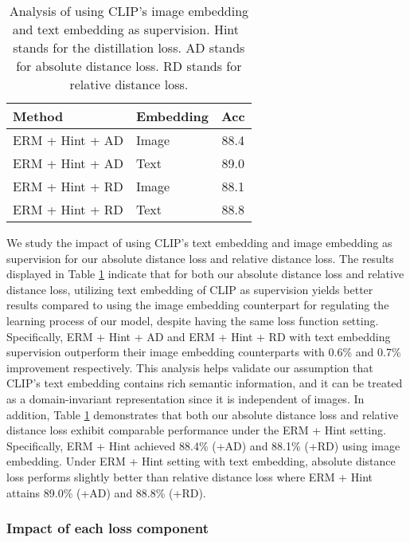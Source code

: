 \documentclass[10pt,twocolumn,letterpaper]{article}
\begin{document}
\begin{table}[htbp]
\begin{center}
\footnotesize
\begin{tabular}{l | l |  c }
\hline
Method & Embedding  & Acc \\
\hline \hline
ERM + Hint + AD & Image  & 88.4\\
\rowcolor{lightgray!30}ERM + Hint + AD & Text  & 89.0\\
\hline
ERM + Hint + RD & Image  & 88.1\\
\rowcolor{lightgray!30}ERM + Hint + RD & Text  & 88.8\\
\hline
\end{tabular}
\vspace{5pt}
\caption{Analysis of using CLIP's image embedding and text embedding as supervision. Hint~\cite{hinton2015distilling} stands for the distillation loss. AD stands for absolute distance loss. RD stands for relative distance loss.}
\label{table:textregu}
\end{center}
\end{table}

We study the impact of using CLIP's text embedding and image embedding as supervision for our absolute distance loss and relative distance loss.
The results displayed in Table \ref{table:textregu} indicate that for both our absolute distance loss and relative distance loss, utilizing text embedding of CLIP as supervision yields better results compared to using the image embedding counterpart for regulating the learning process of our model, despite having the same loss function setting. Specifically, ERM + Hint + AD and ERM + Hint + RD with text embedding supervision outperform their image embedding counterparts with 0.6\% and 0.7\% improvement respectively. This analysis helps validate our assumption that CLIP's text embedding contains rich semantic information, and it can be treated as a domain-invariant representation since it is independent of images.
In addition, Table \ref{table:textregu} demonstrates that both our absolute distance loss and relative distance loss exhibit comparable performance under the ERM + Hint setting. Specifically, ERM + Hint achieved 88.4\% (+AD) and 88.1\% (+RD) using image embedding. Under ERM + Hint setting with text embedding, absolute distance loss performs slightly better than relative distance loss where ERM + Hint attains 89.0\% (+AD) and 88.8\% (+RD).


\subsubsection{Impact of each loss component}
\end{document}
